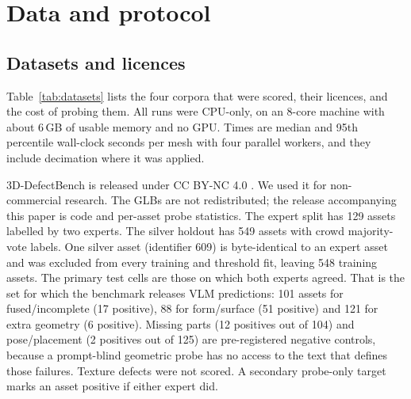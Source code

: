 \section{Data and protocol}
\label{sec:data}

\subsection{Datasets and licences}
Table~\ref{tab:datasets} lists the four corpora that were scored, their licences, and the cost of probing them.
All runs were CPU-only, on an 8-core machine with about 6\,GB of usable memory and no GPU.
Times are median and 95th percentile wall-clock seconds per mesh with four parallel workers, and they include decimation where it was applied.

\begin{table}[t]
  \centering
  \caption{Datasets scored in this study. ``Probed OK'' counts meshes that returned a full feature vector. Peak RSS is the resident set of one worker. Runtimes use four parallel workers on an 8-core CPU and include decimation for MATE-3D and Hi3DBench. Hi3DBench contributes 3{,}060 probed meshes, of which 2{,}797 labelled meshes are analysed. Its labels are MLLM pseudo-labels.}
  \label{tab:datasets}
  \begingroup
  \makeatletter
  \let\paper@arrayparboxrestore\@arrayparboxrestore
  \def\@arrayparboxrestore{\paper@arrayparboxrestore\raggedright}
  \makeatother
  \resizebox{\linewidth}{!}{}
  \endgroup
\end{table}

3D-DefectBench is released under CC BY-NC 4.0 \citep{zhao2026defectbench}.
We used it for non-commercial research.
The GLBs are not redistributed; the release accompanying this paper is code and per-asset probe statistics.
The expert split has 129 assets labelled by two experts.
The silver holdout has 549 assets with crowd majority-vote labels.
One silver asset (identifier 609) is byte-identical to an expert asset and was excluded from every training and threshold fit, leaving 548 training assets.
The primary test cells are those on which both experts agreed.
That is the set for which the benchmark releases VLM predictions: 101 assets for fused/incomplete (17 positive), 88 for form/surface (51 positive) and 121 for extra geometry (6 positive).
Missing parts (12 positives out of 104) and pose/placement (2 positives out of 125) are pre-registered negative controls, because a prompt-blind geometric probe has no access to the text that defines those failures.
Texture defects were not scored.
A secondary probe-only target marks an asset positive if either expert did.

